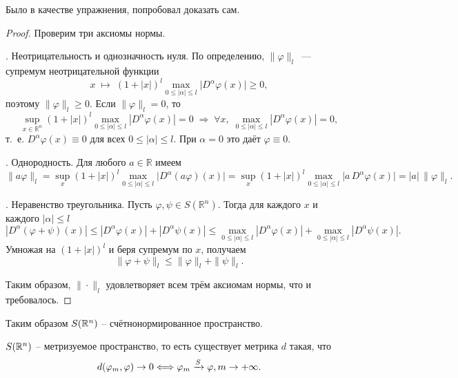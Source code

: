 \begin{note}
    Было в качестве упражнения, попробовал доказать сам.
\end{note}

\begin{proof}
    Проверим три аксиомы нормы.

    \medskip
    . Неотрицательность и однозначность нуля.
    По определению, \(\|\varphi\|_l\)~--- супремум неотрицательной функции
    \[
        x\;\mapsto\;(1+|x|)^l \max_{0 \le |\alpha|\le l}\bigl|D^\alpha\varphi(x)\bigr|\ge0,
    \]
    поэтому \(\|\varphi\|_l\ge0\). Если \(\|\varphi\|_l=0\), то
    \[
        \sup_{x\in\mathbb{R}^n}(1+|x|)^l\max_{0 \le |\alpha|\le l}|D^\alpha\varphi(x)|=0
        \;\Longrightarrow\;
        \forall x,\;\max_{0 \le |\alpha|\le l}|D^\alpha\varphi(x)|=0,
    \]
    т.~е. \(D^\alpha\varphi(x)\equiv0\) для всех \(0 \le |\alpha|\le l\). При \(\alpha=0\) это даёт \(\varphi\equiv0\).

    \medskip
    . Однородность.
    Для любого \(a\in\mathbb{R}\) имеем
    \[
        \|a\varphi\|_l
        =\sup_x(1+|x|)^l\max_{0 \le |\alpha|\le l}\bigl|D^\alpha(a\varphi)(x)\bigr|
        =\sup_x(1+|x|)^l\max_{0 \le |\alpha|\le l}\bigl|a\,D^\alpha\varphi(x)\bigr|
        =|a|\,\|\varphi\|_l.
    \]

    \medskip
    . Неравенство треугольника.
    Пусть \(\varphi,\psi\in S(\mathbb{R}^n)\). Тогда для каждого \(x\) и каждого \(|\alpha|\le l\)
    \[
        |D^\alpha(\varphi+\psi)(x)|
        \le|D^\alpha\varphi(x)|+|D^\alpha\psi(x)|
        \le\max_{0 \le |\alpha|\le l}|D^\alpha\varphi(x)|+\max_{0 \le |\alpha|\le l}|D^\alpha\psi(x)|.
    \]
    Умножая на \((1+|x|)^l\) и беря супремум по \(x\), получаем
    \[
        \|\varphi+\psi\|_l
        \le\|\varphi\|_l+\|\psi\|_l.
    \]

    Таким образом, \(\|\cdot\|_l\) удовлетворяет всем трём аксиомам нормы, что и требовалось.
\end{proof}
\begin{note}
    Таким образом $S(\mathbb{R}^n)$ -- счётнонормированное пространство.
\end{note}
\begin{theorem}
    $S(\mathbb{R}^n)$ -- метризуемое пространство, то есть существует метрика $d$ такая, что \[d(\varphi_m, \varphi) \rightarrow 0 \Longleftrightarrow \varphi_m \xrightarrow{S} \varphi, m \rightarrow +\infty.\]
\end{theorem}
